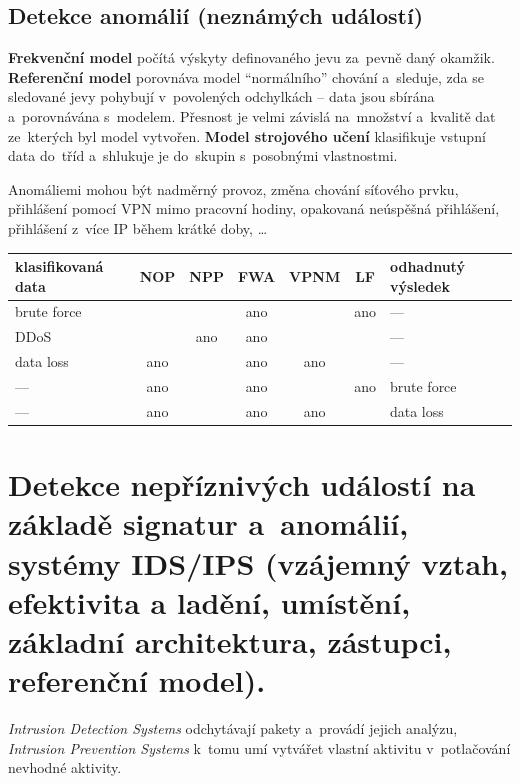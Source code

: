 \subsection{Detekce anomálií (neznámých událostí)}

\textbf{Frekvenční model} počítá výskyty definovaného jevu za~pevně daný okamžik. \textbf{Referenční model} porovnáva model \enquote{normálního} chování a~sleduje, zda se sledované jevy pohybují v~povolených odchylkách -- data jsou sbírána a~porovnávána s~modelem. Přesnost je velmi závislá na~množství a~kvalitě dat ze~kterých byl model vytvořen. \textbf{Model strojového učení} klasifikuje vstupní data do~tříd a~shlukuje je do~skupin s~posobnými vlastnostmi.

Anomáliemi mohou být nadměrný provoz, změna chování síťového prvku, přihlášení pomocí VPN mimo pracovní hodiny, opakovaná neúspěšná přihlášení, přihlášení z~více IP během krátké doby, \dots

\begin{table}[ht]
    \centering
    \begin{tabular}{l|ccccc|l}
        \textbf{klasifikovaná data} & NOP & NPP & FWA & VPNM & LF  & \textbf{odhadnutý výsledek} \\
        \hline
        brute force                 &     &     & ano &      & ano & ---                         \\
        DDoS                        &     & ano & ano &      &     & ---                         \\
        data loss                   & ano &     & ano & ano  &     & ---                         \\
        \hline
        ---                         & ano &     & ano &      & ano & brute force                 \\
        ---                         & ano &     & ano & ano  &     & data loss                   \\
    \end{tabular}
\end{table}


\clearpage
\section{Detekce nepříznivých událostí na základě signatur a~anomálií, systémy IDS/IPS (vzájemný vztah, efektivita a ladění, umístění, základní architektura, zástupci, referenční model).}

\emph{Intrusion Detection Systems} odchytávají pakety a~provádí jejich analýzu, \emph{Intrusion Prevention Systems} k~tomu umí vytvářet vlastní aktivitu v~potlačování nevhodné aktivity.


